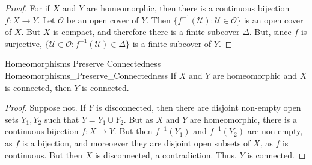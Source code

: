 \documentclass{book}                                                           %
\begin{document}
            \begin{proof}
                For if $X$ and $Y$ are homeomorphic, then there
                is a continuous bijection $f:X\rightarrow{Y}$.
                Let $\mathcal{O}$ be an open cover of $Y$.
                Then $\{f^{-1}(\mathcal{U}):\mathcal{U}\in\mathcal{O}\}$
                is an open cover of $X$. But $X$ is compact, and therefore
                there is a finite subcover $\Delta$. But, since $f$ is
                surjective,
                $\{\mathcal{U}\in\mathcal{O}:f^{-1}(\mathcal{U})\in\Delta\}$
                is a finite subcover of $Y$.
            \end{proof}
            \begin{ltheorem}{Homeomorphisms Preserve Connectedness}
                            {Homeomorphisms_Preserve_Connectedness}
                If $X$ and $Y$ are homeomorphic and
                $X$ is connected, then $Y$ is connected.
            \end{ltheorem}
            \begin{proof}
                Suppose not. If $Y$ is disconnected, then there are disjoint
                non-empty open sets $Y_{1},Y_{2}$ such that
                $Y=Y_{1}\cup{Y_{2}}$. But as $X$ and $Y$ are homeomorphic,
                there is a continuous bijection $f:X\rightarrow{Y}$. But then
                $f^{-1}(Y_{1})$ and $f^{-1}(Y_{2})$ are non-empty, as $f$ is a
                bijection, and moreoever they are disjoint open subsets of $X$,
                as $f$ is continuous. But then $X$ is disconnected,
                a contradiction. Thus, $Y$ is connected.
            \end{proof}
\end{document}
